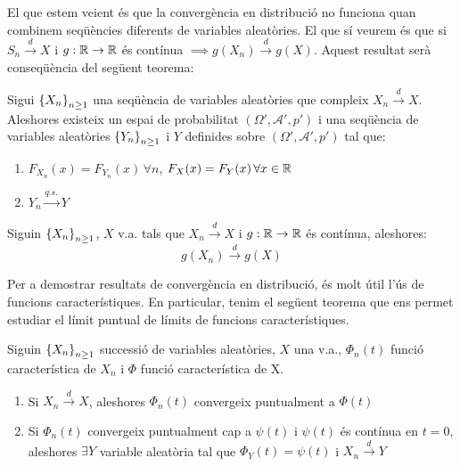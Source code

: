 El que estem veient és que la convergència en distribució no funciona quan combinem seqüències diferents de
variables aleatòries. El que sí veurem és que si $S_n \overset{d}{\to} X$ i $g:\mathbb{R} \to \mathbb{R}$ és contínua
$\implies g(X_n) \overset{d}{\to} g(X)$. Aquest resultat serà conseqüència del següent teorema:

\begin{thm}
  Sigui $\left\{X_n\right\}_{n\geq1}$ una seqüència de variables aleatòries que compleix $X_n \overset{d}{\to} X$.
  Aleshores existeix un espai de probabilitat $(\Omega', \mathcal{A}', p')$ i una seqüència de variables aleatòries $\left\{Y_n\right\}_{n\geq1}$ i $Y$ definides sobre $(\Omega', \mathcal{A}', p')$ tal que:
  
  \begin{enumerate}
      \item $F_{X_n}(x) = F_{Y_n}(x) \, \forall n$, $F_X(x) = F_Y(x) \, \forall x \in \mathbb{R}$
      \item $Y_n \overset{q.s.}{\to} Y$
  \end{enumerate}
\end{thm}

\begin{col}
  Siguin $\left\{X_n\right\}_{n\geq1}$, $X$ v.a. tals que $X_n \overset{d}{\to} X$ i $g: \mathbb{R} \to \mathbb{R}$ és
  contínua, aleshores:
  \[
    g(X_n) \overset{d}{\to} g(X)
  \]
\end{col}

Per a demostrar resultats de convergència en distribució, és molt útil l'ús de funcions característiques.
En particular, tenim el següent teorema que ens permet estudiar el límit puntual de límits de funcions característiques.

\begin{thm}
  Siguin $\left\{X_n\right\}_{n\geq1}$ successió de variables aleatòries, $X$ una v.a., $\Phi_n(t)$ funció característica de $X_n$ i $\Phi$ funció característica de X.
  
  \begin{enumerate}
      \item Si $X_n \overset{d}{\to} X$, aleshores $\Phi_n(t)$ convergeix puntualment a $\Phi(t)$
      \item Si $\Phi_n(t)$ convergeix puntualment cap a $\psi(t)$ i $\psi(t)$ és contínua en $t=0$, aleshores $\exists Y$ variable aleatòria tal que $\Phi_Y(t) = \psi(t)$ i $X_n \overset{d}{\to} Y$
  \end{enumerate}
  
\end{thm}

